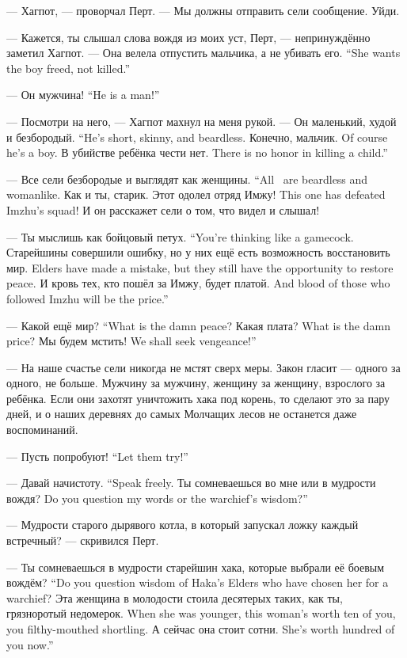 --- Хагпот, --- проворчал Перт.
--- Мы должны отправить сели сообщение.
Уйди.

--- Кажется, ты слышал слова вождя из моих уст, Перт, --- непринуждённо заметил Хагпот.
{--- Она велела отпустить мальчика, а не убивать его.}
{``She wants the boy freed, not killed.''}

{--- Он мужчина!}
{``He is a man!''}

--- Посмотри на него, --- Хагпот махнул на меня рукой.
{--- Он маленький, худой и безбородый.}
{``He's short, skinny, and beardless.}
{Конечно, мальчик.}
{Of course he's a boy.}
{В убийстве ребёнка чести нет.}
{There is no honor in killing a child.''}

{--- Все сели безбородые и выглядят как женщины.}
{``All \Seli\ are beardless and womanlike.}
Как и ты, старик.
{Этот одолел отряд Имжу!}
{This one has defeated Imzhu's squad!}
И он расскажет сели о том, что видел и слышал!

{--- Ты мыслишь как бойцовый петух.}
{``You're thinking like a gamecock.}
{Старейшины совершили ошибку, но у них ещё есть возможность восстановить мир.}
{Elders have made a mistake, but they still have the opportunity to restore peace.}
{И кровь тех, кто пошёл за Имжу, будет платой.}
{And blood of those who followed Imzhu will be the price.''}

{--- Какой ещё мир?}
{``What is the damn peace?}
{Какая плата?}
{What is the damn price?}
{Мы будем мстить!}
{We shall seek vengeance!''}

--- На наше счастье сели никогда не мстят сверх меры.
Закон гласит --- одного за одного, не больше.
Мужчину за мужчину, женщину за женщину, взрослого за ребёнка.
Если они захотят уничтожить хака под корень, то сделают это за пару дней, и о наших деревнях до самых Молчащих лесов не останется даже воспоминаний.

{--- Пусть попробуют!}
{``Let them try!''}

{--- Давай начистоту.}
{``Speak freely.}
{Ты сомневаешься во мне или в мудрости вождя?}
{Do you question my words or the warchief's wisdom?''}

--- Мудрости старого дырявого котла, в который запускал ложку каждый встречный? --- скривился Перт.

{--- Ты сомневаешься в мудрости старейшин хака, которые выбрали её боевым вождём?}
{``Do you question wisdom of Haka's Elders who have chosen her for a warchief?}
{Эта женщина в молодости стоила десятерых таких, как ты, грязноротый недомерок.}
{When she was younger, this woman's worth ten of you, you filthy-mouthed shortling.}
{А сейчас она стоит сотни.}
{She's worth hundred of you now.''}

